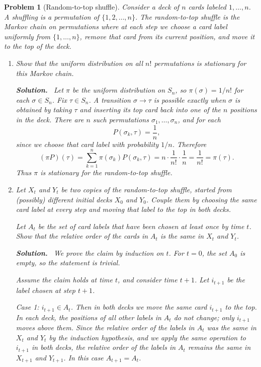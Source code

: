 \documentclass[11pt]{article}
\newtheorem{problem}{Problem}
\newenvironment{solution}{\par\noindent\textbf{Solution.}\ }{\par}
\begin{document}
\bigskip

\begin{problem}[Random-to-top shuffle]
Consider a deck of $n$ cards labeled $1,\dots,n$. A shuffling is a permutation of
$\{1,2,\dots,n\}$. The random-to-top shuffle is the Markov chain on permutations
where at each step we choose a card label uniformly from $\{1,\dots,n\}$, remove
that card from its current position, and move it to the top of the deck.

\begin{enumerate}
\item Show that the uniform distribution on all $n!$ permutations is stationary for
this Markov chain.

\begin{solution}
Let $\pi$ be the uniform distribution on $S_n$, so $\pi(\sigma) = 1/n!$ for each
$\sigma \in S_n$. Fix $\tau \in S_n$. A transition $\sigma \to \tau$ is possible
exactly when $\sigma$ is obtained by taking $\tau$ and inserting its top card back
into one of the $n$ positions in the deck. There are $n$ such permutations
$\sigma_1,\dots,\sigma_n$, and for each
\[
  P(\sigma_k,\tau) = \frac{1}{n},
\]
since we choose that card label with probability $1/n$.
Therefore
\[
  (\pi P)(\tau)
  = \sum_{k=1}^n \pi(\sigma_k) P(\sigma_k,\tau)
  = n \cdot \frac{1}{n!} \cdot \frac{1}{n}
  = \frac{1}{n!}
  = \pi(\tau).
\]
Thus $\pi$ is stationary for the random-to-top shuffle.\qedhere
\end{solution}

\item Let $X_t$ and $Y_t$ be two copies of the random-to-top shuffle, started from
(possibly) different initial decks $X_0$ and $Y_0$. Couple them by choosing the
same card label at every step and moving that label to the top in both decks.

Let $A_t$ be the set of card labels that have been chosen at least once by time
$t$. Show that the relative order of the cards in $A_t$ is the same in $X_t$ and
$Y_t$.

\begin{solution}
We prove the claim by induction on $t$. For $t=0$, the set $A_0$ is empty, so the
statement is trivial.

Assume the claim holds at time $t$, and consider time $t+1$. Let $i_{t+1}$ be the
label chosen at step $t+1$.

\textit{Case 1:} $i_{t+1} \in A_t$. Then in both decks we move the same card
$i_{t+1}$ to the top. In each deck, the positions of all other labels in $A_t$ do
not change; only $i_{t+1}$ moves above them. Since the relative order of the
labels in $A_t$ was the same in $X_t$ and $Y_t$ by the induction hypothesis, and
we apply the same operation to $i_{t+1}$ in both decks, the relative order of the
labels in $A_t$ remains the same in $X_{t+1}$ and $Y_{t+1}$. In this case
$A_{t+1} = A_t$.


\end{solution}
\end{enumerate}
\end{problem}
\end{document}
